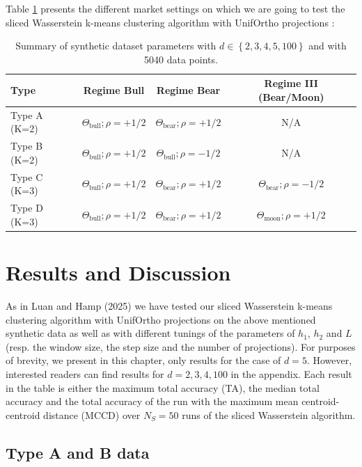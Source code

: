 \documentclass[12pt,a4paper]{report}
\begin{document}
Table \ref{tab:dataset_parameters} presents the different market settings on which we are going to test the sliced Wasserstein k-means clustering algorithm with UnifOrtho projections :
\begin{table}[H]
    \centering
    \caption{Summary of synthetic dataset parameters with $d\in \left\{2, 3,4,5, 100\right\}$ and with 5040 data points.}
    \label{tab:dataset_parameters}
    \begin{tabular}{lccc}
        \toprule
        Type & Regime Bull & Regime Bear & Regime III (Bear/Moon)  \\ 
        \midrule
        Type A (K=2) & $\Theta_{\text{bull}}; \rho = +1/2$ & $\Theta_{\text{bear}}; \rho = +1/2$ & N/A \\
        Type B (K=2) & $\Theta_{\text{bull}}; \rho = +1/2$ & $\Theta_{\text{bull}}; \rho = -1/2$ & N/A \\
        Type C (K=3) & $\Theta_{\text{bull}}; \rho = +1/2$ & $\Theta_{\text{bear}}; \rho = +1/2$ & $\Theta_{\text{bear}}; \rho = -1/2$ \\
        Type D (K=3) & $\Theta_{\text{bull}}; \rho = +1/2$ & $\Theta_{\text{bear}}; \rho = +1/2$ & $\Theta_{\text{moon}}; \rho = +1/2$ \\
        \bottomrule
    \end{tabular}
\end{table}

\section{Results and Discussion}
As in Luan and Hamp (2025)\cite{LuanHamp2025} we have tested our sliced Wasserstein k-means clustering algorithm with UnifOrtho projections on the above mentioned synthetic data as well as with different tunings
of the parameters of $h_1$, $h_2$ and $L$ (resp. the window size, the step size and the number of projections). 
For purposes of brevity, we present in this chapter, only results for the case of $d=5$. However, interested readers can find results for $d=2,3,4, 100$ in the appendix. 
Each result in the table is either the maximum total accuracy (TA), the median total accuracy and the total accuracy of the run with the maximum mean centroid-centroid distance (MCCD) over $N_S= 50$ runs of the sliced Wasserstein algorithm.

\subsection{Type A and B data}
\end{document}
